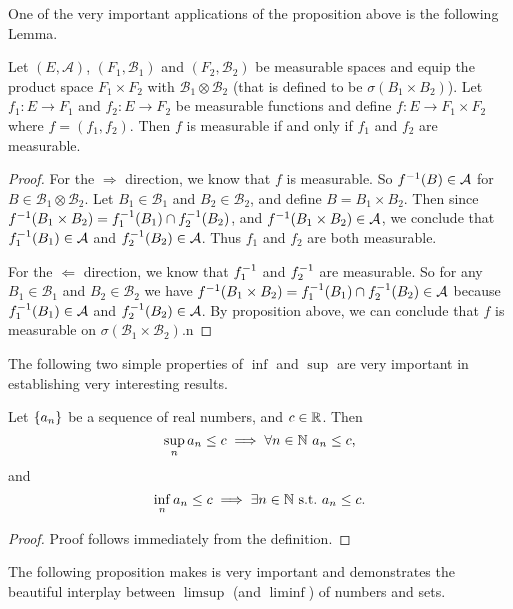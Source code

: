 One of the very important applications of the proposition above is the following Lemma.
\begin{lemma}
	Let $ (E,\mathcal{A}) $, $ (F_1,\mathcal{B}_1) $ and $ (F_2,\mathcal{B}_2) $ be measurable spaces and equip the product space $ F_1\times F_2 $ with $ \mathcal{B}_1 \otimes \mathcal{B}_2 $ (that is defined to be $ \sigma(B_1\times B_2) $). Let $ f_1: E\to F_1 $ and $ f_2: E \to F_2 $ be measurable functions and define $ f: E \to F_1\times F_2 $ where $ f = (f_1,f_2) $. Then $ f $ is measurable if and only if $ f_1 $ and $ f_2 $ are measurable.
\end{lemma}
\begin{proof}
	For the $ \boxed{\Longrightarrow} $ direction, we know that $ f $ is measurable. So $ f^{-1}(B) \in \mathcal{A} $ for $ B \in \mathcal{B}_1\otimes \mathcal{B}_2 $. Let $ B_1\in\mathcal{B}_1 $ and $ B_2 \in \mathcal{B}_2 $, and define $ B = B_1\times B_2 $. Then since $ f^{-1}(B_1\times B_2) = f_1^{-1}(B_1) \cap f_2^{-1}(B_2) $, and $ f^{-1}(B_1\times B_2) \in \mathcal{A} $, we conclude that $ f^{-1}_1(B_1)\in \mathcal{A} $ and $ f^{-1}_2(B_2) \in \mathcal{A} $. Thus $ f_1 $ and $ f_2 $ are both measurable.
	
	For the $ \boxed{\Longleftarrow} $ direction, we know that $ f^{-1}_1 $ and $ f^{-1}_2 $ are measurable. So for any $ B_1 \in \mathcal{B}_1 $ and $ B_2\in \mathcal{B}_2 $ we have $ f^{-1}(B_1\times B_2) = f^{-1}_1(B_1) \cap f^{-1}_2(B_2) \in \mathcal{A} $ because $ f^{-1}_1(B_1) \in \mathcal{A} $ and $ f^{-1}_2(B_2)\in \mathcal{A} $. By proposition above, we can conclude that $ f $ is measurable on $ \sigma(\mathcal{B}_1\times \mathcal{B}_2) $.n 
\end{proof}



The following two simple properties of $ \inf $ and $ \sup $ are very important in establishing very interesting results.
\begin{lemma}
	Let $ \{a_n\} $ be a sequence of real numbers, and $ c \in \mathbb{R} $. Then
	\[ \sup_n a_n \leq c \implies \forall n \in \mathbb{N}\ a_n \leq c, \]
	and
	\[ \inf_n a_n \leq c \implies \exists n \in \mathbb{N} \ \text{s.t.}\  a_n \leq c. \]
\end{lemma}
\begin{proof}
	Proof follows immediately from the definition.
\end{proof}
The following proposition makes is very important and demonstrates the beautiful interplay between $ \limsup $ (and $ \liminf $) of numbers and sets.

